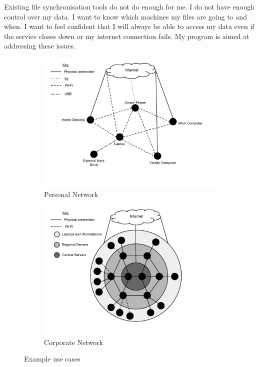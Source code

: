 \documentclass[12pt]{article}
\begin{document}
Existing file synchronisation tools do not do enough
for me. I do not have enough control over my data.
I want to know which machines my files are going to and when.
I want to feel confident that I will always be able to access
my data even if the service closes down or my internet connection
fails. My program is aimed at addressing these issues.


\begin{figure}[htp]
    \begin{subfigure}[b]{1\textwidth}
        \centering
        \includegraphics[scale=0.60]{images/PersonalGraph.pdf}
        \caption{Personal Network}
        \label{fig:personal_graph}
    \end{subfigure}
    \begin{subfigure}[b]{1\textwidth}
        \centering
        \includegraphics[scale=0.60]{images/CorporateGraph.pdf}
        \caption{Corporate Network}
        \label{fig:corp_graph}
    \end{subfigure}
    \caption{Example use cases}
\end{figure}
\end{document}
